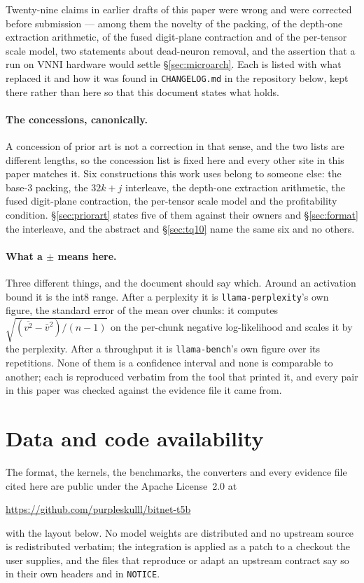 \documentclass[11pt,a4paper]{article}
\newcommand{\code}[1]{\texttt{#1}}
\begin{document}
Twenty-nine claims in earlier drafts of this paper were wrong and were corrected
before submission --- among them the novelty of the packing, of the depth-one
extraction arithmetic, of the fused digit-plane contraction and of the
per-tensor scale model, two statements about dead-neuron removal, and the assertion that a
run on VNNI hardware would settle \S\ref{sec:microarch}. Each is listed with
what replaced it and how it was found in \code{CHANGELOG.md} in the repository
below, kept there rather than here so that this document states what holds.

\paragraph{The concessions, canonically.} A concession of prior art is not a
correction in that sense, and the two lists are different lengths, so the
concession list is fixed here and every other site in this paper matches it.
Six constructions this work uses belong to someone else: the base-3 packing,
the $32k+j$ interleave, the depth-one extraction arithmetic, the fused
digit-plane contraction, the per-tensor scale model and the profitability
condition. \S\ref{sec:priorart} states five of them against their owners and
\S\ref{sec:format} the interleave, and the abstract and \S\ref{sec:tq10} name
the same six and no others.

\paragraph{What a $\pm$ means here.}
Three different things, and the document should say which. Around an activation
bound it is the int8 range. After a perplexity it is
\code{llama-perplexity}'s own figure, the standard error of the mean over
chunks: it computes $\sqrt{(\overline{v^{2}}-\bar v^{2})/(n-1)}$ on the
per-chunk negative log-likelihood and scales it by the perplexity. After a
throughput it is \code{llama-bench}'s own figure over its repetitions. None of
them is a confidence interval and none is comparable to another; each is
reproduced verbatim from the tool that printed it, and every pair in this paper
was checked against the evidence file it came from.

\section*{Data and code availability}

The format, the kernels, the benchmarks, the converters and every evidence file
cited here are public under the Apache License~2.0 at
\begin{center}
\url{https://github.com/purpleskulll/bitnet-t5b}
\end{center}
with the layout below. No model weights are distributed and no upstream source
is redistributed verbatim; the integration is applied as a patch to a checkout
the user supplies, and the files that reproduce or adapt an upstream contract
say so in their own headers and in \code{NOTICE}.
\end{document}
